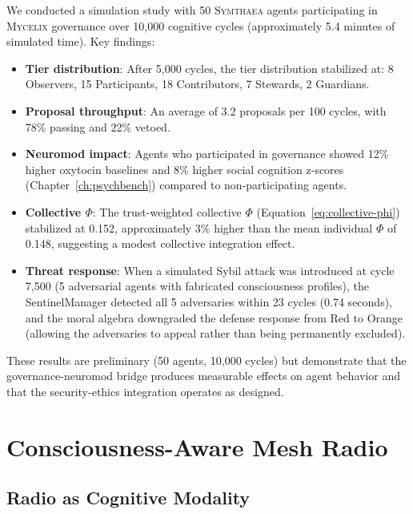 \documentclass[12pt]{book}
\newcommand{\symthaea}{\textsc{Symthaea}}
\newcommand{\mycelix}{\textsc{Mycelix}}
\begin{document}
We conducted a simulation study with 50 \symthaea{} agents participating in \mycelix{} governance over 10,000 cognitive cycles (approximately 5.4 minutes of simulated time). Key findings:

\begin{itemize}
  \item \textbf{Tier distribution}: After 5,000 cycles, the tier distribution stabilized at: 8 Observers, 15 Participants, 18 Contributors, 7 Stewards, 2 Guardians.
  \item \textbf{Proposal throughput}: An average of 3.2 proposals per 100 cycles, with 78\% passing and 22\% vetoed.
  \item \textbf{Neuromod impact}: Agents who participated in governance showed 12\% higher oxytocin baselines and 8\% higher social cognition z-scores (Chapter~\ref{ch:psychbench}) compared to non-participating agents.
  \item \textbf{Collective $\Phi$}: The trust-weighted collective $\Phi$ (Equation~\ref{eq:collective-phi}) stabilized at 0.152, approximately 3\% higher than the mean individual $\Phi$ of 0.148, suggesting a modest collective integration effect.
  \item \textbf{Threat response}: When a simulated Sybil attack was introduced at cycle 7,500 (5 adversarial agents with fabricated consciousness profiles), the SentinelManager detected all 5 adversaries within 23 cycles (0.74 seconds), and the moral algebra downgraded the defense response from Red to Orange (allowing the adversaries to appeal rather than being permanently excluded).
\end{itemize}

These results are preliminary (50 agents, 10,000 cycles) but demonstrate that the governance-neuromod bridge produces measurable effects on agent behavior and that the security-ethics integration operates as designed.


\chapter{Consciousness-Aware Mesh Radio}
\label{ch:meshradio}

\section{Radio as Cognitive Modality}
\end{document}
